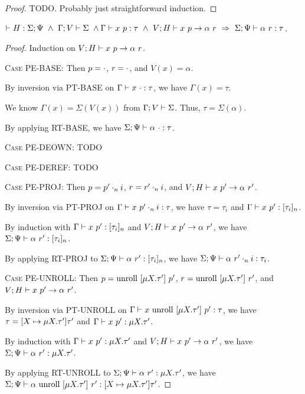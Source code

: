 \documentclass{article}
\begin{document}
\begin{proof}
  TODO. Probably just straightforward induction.
\end{proof}

\begin{lem}
  $\HWF{H}{\Sigma}{\Psi}\ \land\ \SWF{\Gamma}{V}{\Sigma}\ \land\ \\
   \PType{\Gamma}{x}{p}{\tau}\ \land\ \PEval{V}{H}{x}{p}{\alpha}{r}\ \Rightarrow\
   \ARType{\Sigma}{\Psi}{\alpha}{r}{\tau}$.
\end{lem}

\begin{proof}
  Induction on ${{V};{H}} \vdash {{x}\ {p}} \rightarrow {{\alpha}\ {r}}$.

  \textsc{Case PE-BASE}:
    Then $p = \cdot$, $r = \cdot$, and $V(x) = \alpha$.

    By inversion via \textsc{PT-BASE} on ${{\Gamma}} \vdash {{x}\ {\cdot}} : {{\tau}}$, we have $\Gamma(x)=\tau$.

    We know $\Gamma(x) = \Sigma(V(x))$ from ${\Gamma}; {V} \vdash {\Sigma}$.
    Thus, $\tau = \Sigma(\alpha)$.

    By applying \textsc{RT-BASE}, we have ${{{\Sigma}} ;{{\Psi}}} \vdash {{{\alpha}\ {\cdot}}} : {{{\tau}}}$.

  \textsc{Case PE-DEOWN}: TODO

  \textsc{Case PE-DEREF}: TODO

  \textsc{Case PE-PROJ}:
    Then $p = {p'}\cdot_{n} {i}$, $r = {r'}\cdot_{n} {i}$, and ${{V};{H}} \vdash {{x}\ {p'}} \rightarrow {{\alpha}\ {r'}}$.

    By inversion via \textsc{PT-PROJ} on ${{\Gamma}} \vdash {{x}\ {{p'}\cdot_{n} {i}}} : {{\tau}}$,
    we have $\tau = \tau_i$ and ${{\Gamma}} \vdash {{x}\ {p'}} : {{[ {\tau_i} ]_{n}}}$.

    By induction with ${{\Gamma}} \vdash {{x}\ {p'}} : {{[ {\tau_i} ]_{n}}}$
    and ${{V};{H}} \vdash {{x}\ {p'}} \rightarrow {{\alpha}\ {r'}}$,
    we have ${{{\Sigma}} ;{{\Psi}}} \vdash {{{\alpha}\ {r'}}} : {{{[ {\tau_i} ]_{n}}}}$.

    By applying \textsc{RT-PROJ} to ${{{\Sigma}} ;{{\Psi}}} \vdash {{{\alpha}\ {r'}}} : {{{[ {\tau_i} ]_{n}}}}$,
    we have ${{{\Sigma}} ;{{\Psi}}} \vdash {{{\alpha}\ {{r'}\cdot_{n} {i}}}} : {{{\tau_i}}}$.

  \textsc{Case PE-UNROLL}:
    Then $p = \textrm{unroll}\ [{\mu {X}.{\tau'}}]\ {p'}$, $r = \textrm{unroll}\ [{\mu {X}.{\tau'}}]\ {r'}$,
    and ${{V};{H}} \vdash {{x}\ {p'}} \rightarrow {{\alpha}\ {r'}}$.

    By inversion via \textsc{PT-UNROLL} on ${{\Gamma}} \vdash {{x}\ {\textrm{unroll}\ [{\mu {X}.{\tau'}}]\ {p'}}} : {{\tau}}$,
    we have $\tau = [{X} \mapsto {\mu {X}.{\tau'}}]{\tau'}$ and ${{\Gamma}} \vdash {{x}\ {p'}} : {{\mu {X}.{\tau'}}}$.

    By induction with ${{\Gamma}} \vdash {{x}\ {p'}} : {{\mu {X}.{\tau'}}}$ and ${{V};{H}} \vdash {{x}\ {p'}} \rightarrow {{\alpha}\ {r'}}$,
    we have ${{{\Sigma}} ;{{\Psi}}} \vdash {{{\alpha}\ {r'}}} : {{{\mu {X}.{\tau'}}}}$.

    By applying \textsc{RT-UNROLL} to ${{{\Sigma}} ;{{\Psi}}} \vdash {{{\alpha}\ {r'}}} : {{{\mu {X}.{\tau'}}}}$,
    we have
    ${{{\Sigma}} ;{{\Psi}}} \vdash {{{\alpha}\ {\textrm{unroll}\ [{\mu {X}.{\tau'}}]\ {r'}}}} : {{{[{X} \mapsto {\mu {X}.{\tau'}}]{\tau'}}}}$.
\end{proof}
\end{document}

